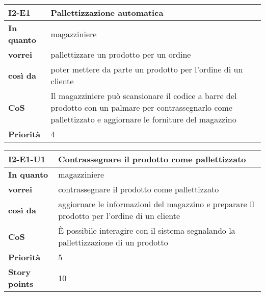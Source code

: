 \begin{table}[H]
  \begin{tabularx}{\textwidth}{lX}
    \toprule
    \textbf{I2-E1} & \textbf{Pallettizzazione automatica} \\
    \midrule
    \textbf{In quanto} & magazziniere \\
    \textbf{vorrei} & pallettizzare un prodotto per un ordine \\
    \textbf{così da} & poter mettere da parte un prodotto per l'ordine di un cliente \\
    \midrule
    \textbf{CoS} & Il magazziniere può scansionare il codice a barre del prodotto con un palmare per contrassegnarlo come pallettizzato e aggiornare le forniture del magazzino \\
    \midrule
    \textbf{Priorità} & 4 \\
    \bottomrule
  \end{tabularx}
  \label{user-story:i2-e1}
\end{table}

\begin{table}[H]
  \begin{tabularx}{\textwidth}{lX}
    \toprule
    \textbf{I2-E1-U1} & \textbf{Contrassegnare il prodotto come pallettizzato} \\
    \midrule
    \textbf{In quanto} & magazziniere \\
    \textbf{vorrei} & contrassegnare il prodotto come pallettizzato \\
    \textbf{così da} & aggiornare le informazioni del magazzino e preparare il prodotto per l'ordine di un cliente \\
    \midrule
    \textbf{CoS} & È possibile interagire con il sistema segnalando la pallettizzazione di un prodotto \\
    \midrule
    \textbf{Priorità} & 5 \\
    \textbf{Story points} & 10 \\
    \bottomrule
  \end{tabularx}
  \label{user-story:i2-e1-u1}
\end{table}

